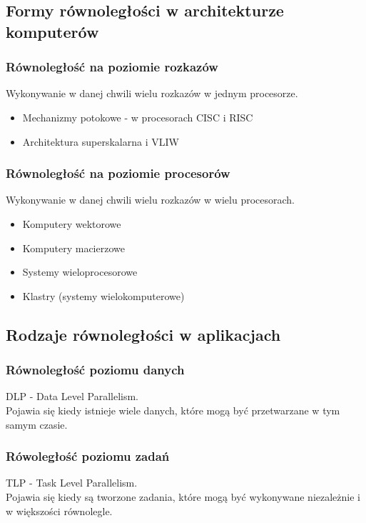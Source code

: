 	\subsection{Formy równoległości w architekturze komputerów}
		\subsubsection{Równoległość na poziomie rozkazów}
			Wykonywanie w danej chwili wielu rozkazów w jednym procesorze.
			\begin{itemize}
				\item Mechanizmy potokowe - w procesorach CISC i RISC
				\item Architektura superskalarna i VLIW
			\end{itemize}
		\subsubsection{Równoległość na poziomie procesorów}
			Wykonywanie w danej chwili wielu rozkazów w wielu procesorach.
			\begin{itemize}
				\item Komputery wektorowe
				\item Komputery macierzowe
				\item Systemy wieloprocesorowe
				\item Klastry (systemy wielokomputerowe)
			\end{itemize}
	\subsection{Rodzaje równoległości w aplikacjach}
		\subsubsection{Równoległość poziomu danych}
			DLP - Data Level Parallelism.\\
			Pojawia się kiedy istnieje wiele danych, które mogą być przetwarzane w tym samym czasie.
		\subsubsection{Rówoległość poziomu zadań}
			TLP - Task Level Parallelism.\\
			Pojawia się kiedy są tworzone zadania, które mogą być wykonywane niezależnie i w większości równolegle.
	
